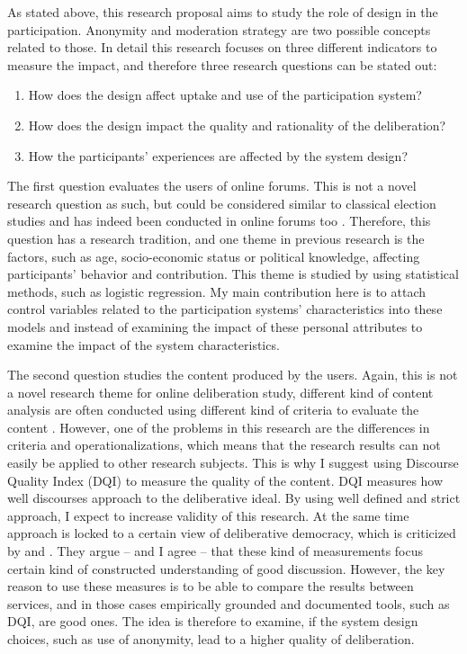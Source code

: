 \documentclass{article}
\begin{document}
As stated above, this research proposal aims to study the role of design in the participation. Anonymity and moderation strategy are two possible concepts related to those. In detail this research focuses on three different indicators to measure the impact, and therefore three research questions can be stated out:

\begin{enumerate}
\item How does the design affect uptake and use of the participation system?
\item How does the design impact the quality and rationality of the deliberation?
\item How the participants' experiences are affected by the system design?
\end{enumerate}

The first question evaluates the users of online forums. This is not a novel research question as such, but could be considered similar to classical election studies and has indeed been conducted in online forums too . Therefore, this question has a research tradition, and one theme in previous research is the factors, such as age, socio-economic status or political knowledge, affecting participants' behavior and contribution. This theme is studied by using statistical methods, such as logistic regression. My main contribution here is to attach control variables related to the participation systems' characteristics into these models and instead of examining the impact of these personal attributes to examine the impact of the system characteristics.

The second question studies the content produced by the users. Again, this is not a novel research theme for online deliberation study, different kind of content analysis are often conducted using different kind of criteria to evaluate the content \cite{pietila02,y,z}. However, one of the problems in this research are the differences in criteria and operationalizations, which means that the research results can not easily be applied to other research subjects. This is why I suggest using   Discourse Quality Index (DQI) to measure the quality of the content. DQI measures how well discourses approach to the deliberative ideal. By using well defined and strict approach, I expect to increase validity of this research. At the same time  approach is locked to a certain view of deliberative democracy, which is criticized by  and . They argue -- and I agree -- that these kind of measurements focus certain kind of constructed understanding of good discussion. However, the key reason to use these measures is to be able to compare the results between services, and in those cases empirically grounded and documented tools, such as DQI, are good ones. The idea is therefore to examine, if the system design choices, such as use of anonymity, lead to a higher quality of deliberation.
\end{document}
